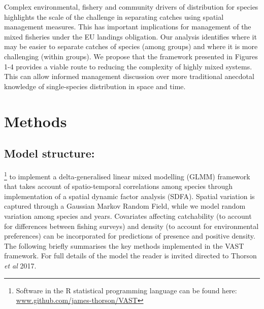 \documentclass{nature}
\begin{document}
\begin{linenumbers}


Complex environmental, fishery and community drivers of distribution for
 species highlights the scale of the challenge
in separating catches  using
spatial management measures. This has important implications for management of
the mixed fisheries under the EU landings obligation. Our analysis identifies
where it may be easier to separate catches of species (among groups) and where
it is more challenging (within groups). We propose that the framework presented
in Figures 1-4 provides a viable route to reducing the complexity of highly
mixed systems.  This can allow informed management discussion over more
traditional anecdotal knowledge of single-species distribution in space and
time.


\section*{Methods}

\subsection{Model structure:} 
 \footnote{Software in the R statistical programming language can be found
	here: \url{www.github.com/james-thorson/VAST}} to implement a
delta-generalised linear mixed modelling (GLMM) framework that takes account of
spatio-temporal correlations among species through implementation of a
spatial dynamic factor analysis (SDFA). Spatial variation is captured through a
Gaussian Markov Random Field, while we model random variation among
species and years. Covariates affecting catchability (to account for
differences between fishing surveys) and density (to account for environmental
preferences) can be incorporated for predictions of presence and positive
density. The following briefly summarises the key methods implemented in the
VAST framework. For full details of the model the reader is invited directed to
Thorson \textit{et al} 2017\cite{Thorson2017}.


\end{linenumbers}
\end{document}
